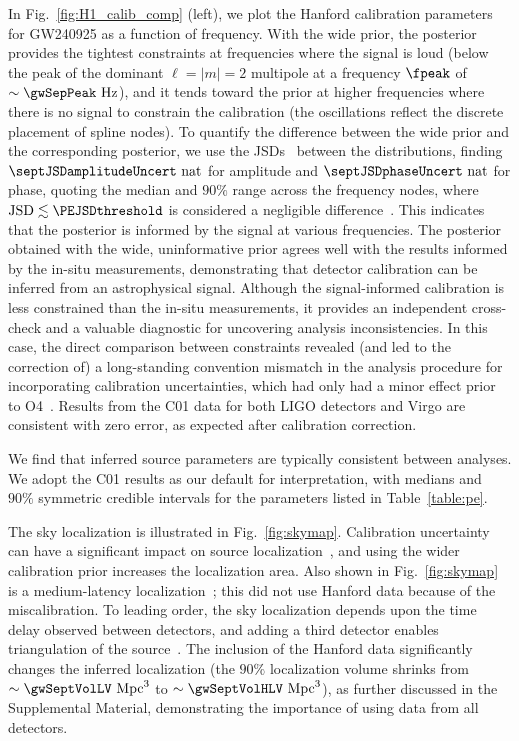 In Fig.~\ref{fig:H1_calib_comp} (left), we plot the Hanford calibration parameters for \ac{GW240925} as a function of frequency.
With the wide prior, the posterior provides the tightest constraints at frequencies where the signal is loud (below the peak of the dominant $\ell = |m| = 2$ multipole at a frequency $\fpeak$ of $\sim\gwSepPeak~\mathrm{Hz}$), and it tends toward the prior at higher frequencies where there is no signal to constrain the calibration (the oscillations reflect the discrete placement of spline nodes).
To quantify the difference between the wide prior and the corresponding posterior, we use the \acp{JSD}~\cite{Lin:1991zzm} between the distributions, finding $\septJSDamplitudeUncert~\mathrm{nat}$ for amplitude and $\septJSDphaseUncert~\mathrm{nat}$ for phase, quoting the median and $90\%$ range across the frequency nodes, where $\mathrm{JSD}\lesssim \PEJSDthreshold$ is considered a negligible difference~\cite{Romero-Shaw:2020owr}.
This indicates that the posterior is informed by the signal at various frequencies.
The posterior obtained with the wide, uninformative prior agrees well with the results informed by the in-situ measurements, demonstrating that detector calibration can be inferred from an astrophysical signal.
Although the signal-informed calibration is less constrained than the in-situ measurements, it provides an independent cross-check and a valuable diagnostic for uncovering analysis inconsistencies.
In this case, the direct comparison between constraints revealed (and led to the correction of) a long-standing convention mismatch in the analysis procedure for incorporating calibration uncertainties, which had only had a minor effect prior to \ac{O4}~\cite{Baka:2025aaa,LIGOScientific:2025yae}.
Results from the \ac{C01} data for both \ac{LIGO} detectors and Virgo are consistent with zero error, as expected after calibration correction.

We find that inferred source parameters are typically consistent between analyses.
We adopt the \ac{C01} results as our default for interpretation, with medians and $90\%$ symmetric credible intervals for the parameters listed in Table~\ref{table:pe}.

The sky localization is illustrated in Fig.~\ref{fig:skymap}.
Calibration uncertainty can have a significant impact on source localization~\cite{Vitale:2011wu,TheLIGOScientific:2016pea,Payne:2020myg}, and using the wider calibration prior increases the localization area.
Also shown in Fig.~\ref{fig:skymap} is a medium-latency localization~\cite{GCN37607}; this did not use Hanford data because of the miscalibration.
To leading order, the sky localization depends upon the time delay observed between detectors, and adding a third detector enables triangulation of the source~\cite{Wen:2010cr,Fairhurst:2010is,Abbott:2020qfu}.
The inclusion of the Hanford data significantly changes the inferred localization (the $90\%$ localization volume shrinks from $\sim\gwSeptVolLV~\mathrm{Mpc}^3$ to $\sim\gwSeptVolHLV~\mathrm{Mpc}^3$), as further discussed in the Supplemental Material\citesupp, demonstrating the importance of using data from all detectors.

